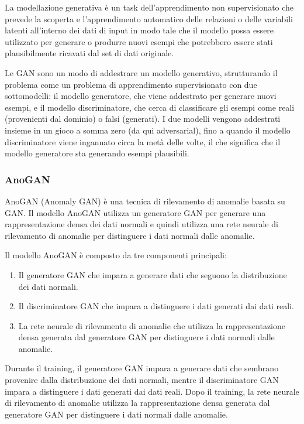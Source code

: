 La modellazione generativa è un task dell'apprendimento non supervisionato che prevede la scoperta e l'apprendimento automatico delle relazioni o delle variabili latenti all'interno dei dati di input in modo tale che il modello possa essere utilizzato per generare o produrre nuovi esempi che potrebbero essere stati plausibilmente ricavati dal set di dati originale.

Le GAN sono un modo di addestrare un modello generativo, strutturando il problema come un problema di apprendimento supervisionato con due sottomodelli: il modello generatore, che viene addestrato per generare nuovi esempi, e il modello discriminatore, che cerca di classificare gli esempi come reali (provenienti dal dominio) o falsi (generati). I due modelli vengono addestrati insieme in un gioco a somma zero (da qui adversarial), fino a quando il modello discriminatore viene ingannato circa la metà delle volte, il che significa che il modello generatore sta generando esempi plausibili.


\subsubsection{AnoGAN}
AnoGAN (Anomaly GAN) è una tecnica di rilevamento di anomalie basata su GAN. Il modello AnoGAN utilizza un generatore GAN per generare una rappresentazione densa dei dati normali e quindi utilizza una rete neurale di rilevamento di anomalie per distinguere i dati normali dalle anomalie.

Il modello AnoGAN è composto da tre componenti principali:

\begin{enumerate}
\item Il generatore GAN che impara a generare dati che seguono la distribuzione dei dati normali.
\item Il discriminatore GAN che impara a distinguere i dati generati dai dati reali.
\item La rete neurale di rilevamento di anomalie che utilizza la rappresentazione densa generata dal generatore GAN per distinguere i dati normali dalle anomalie.
\end{enumerate}

Durante il training, il generatore GAN impara a generare dati che sembrano provenire dalla distribuzione dei dati normali, mentre il discriminatore GAN impara a distinguere i dati generati dai dati reali. Dopo il training, la rete neurale di rilevamento di anomalie utilizza la rappresentazione densa generata dal generatore GAN per distinguere i dati normali dalle anomalie.

